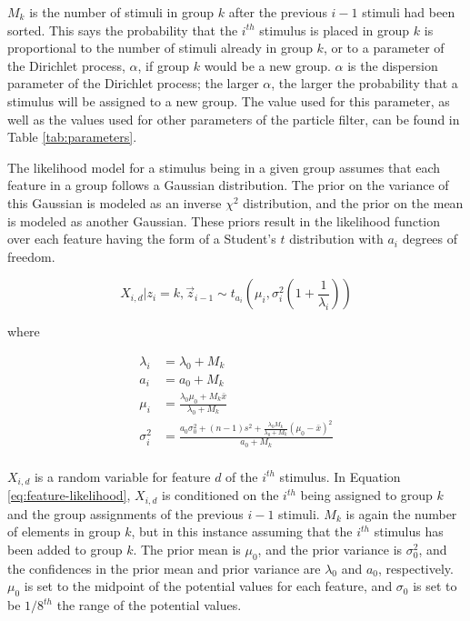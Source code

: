 $M_k$ is the number of stimuli in group $k$ after the previous $i - 1$ stimuli
had been sorted. This says the probability that the $i^{th}$ stimulus is placed
in group $k$ is proportional to the number of stimuli already in group $k$, or
to a parameter of the Dirichlet process, $\alpha$, if group $k$ would be a new
group. $\alpha$ is the dispersion parameter of the Dirichlet process; the larger
$\alpha$, the larger the probability that a stimulus will be assigned to a new
group. The value used for this parameter, as well as the values used for other
parameters of the particle filter, can be found in Table \ref{tab:parameters}.

The likelihood model for a stimulus being in a given group assumes that each
feature in a group follows a Gaussian distribution. The prior on the variance of
this Gaussian is modeled as an inverse $\chi^2$ distribution, and the prior on
the mean is modeled as another Gaussian. These priors result in the
likelihood function over each feature having the form of a Student's $t$
distribution with $a_i$ degrees of freedom. 

\begin{equation}
X_{i,d} | z_i = k,  \vec{z}_{i-1} \sim
t_{a_i}\left(\mu_i, \sigma_i^2 \left(1 + \frac{1}{\lambda_i}\right) \right)
\label{eq:feature-likelihood}
\end{equation}

where

\begin{align}
  \lambda_i &= \lambda_0 + M_k \\
  a_i &= a_0 + M_k \\
  \mu_i &= \frac{\lambda_0 \mu_0 + M_k \bar{x}}{\lambda_0 + M_k} \\
  \sigma_i^2 &= \frac{a_0 \sigma_0^2 + (n - 1) s^2 + \frac{\lambda_0
      M_k}{\lambda_0 + M_k} (\mu_0 - \bar{x})^2}{a_0 + M_k}\\
\end{align}

$X_{i,d}$ is a random variable for feature $d$ of the $i^{th}$ stimulus. In
Equation \ref{eq:feature-likelihood}, $X_{i,d}$ is conditioned on the $i^{th}$
being assigned to group $k$ and the group assignments of the previous $i-1$
stimuli. $M_k$ is again the number of elements in group $k$, but in this
instance assuming that the $i^{th}$ stimulus has been added to group $k$. The
prior mean is $\mu_0$, and the prior variance is $\sigma_0^2$, and the
confidences in the prior mean and prior variance are $\lambda_0$ and $a_0$,
respectively. $\mu_0$ is set to the midpoint of the potential values for each feature,
and $\sigma_0$ is set to be $1/8^{th}$ the range of the potential values.

